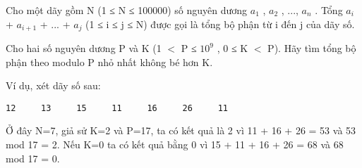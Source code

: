 Cho một dãy gồm N (1 ≤ N ≤ 100000) số nguyên dương $a_{1}$   , $a_{2}$   , ..., $a_{n}$   . Tổng $a_{i}$   + $a_{i+1}$   + ... + $a_{j}$   (1 ≤ i ≤ j ≤ N) được gọi là tổng bộ phận từ i đến j của dãy số.  

   Cho hai số nguyên dương P và K (1 $<$ P ≤ $10^{9}$   , 0 ≤ K $<$ P). Hãy tìm tổng bộ phận theo modulo P nhỏ nhất không bé hơn K.  

   Ví dụ, xét dãy số sau:  
\begin{verbatim}
12     13     15     11     16     26     11
\end{verbatim}

   Ở đây N=7, giả sử K=2 và P=17, ta có kết quả là 2 vì 11 + 16 + 26 = 53 và 53 mod 17 = 2. Nếu K=0 ta có kết quả bằng 0 vì 15 + 11 + 16 + 26 = 68 và 68 mod 17 = 0.